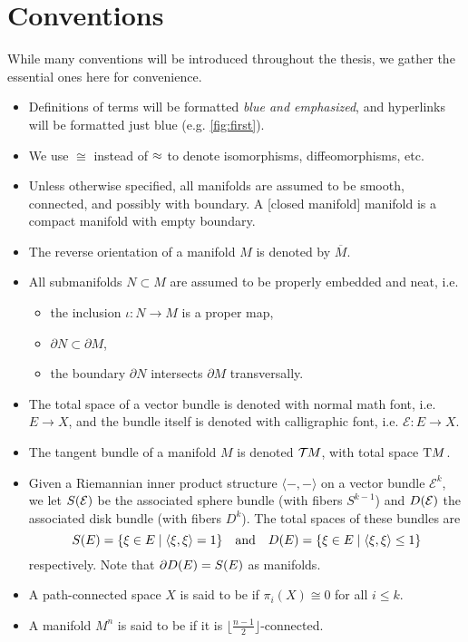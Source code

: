 \section*{Conventions}

While many conventions will be introduced throughout the thesis, we gather the essential ones here for convenience.

\begin{itemize}
  \item Definitions of terms will be formatted {\color{blue}\emph{blue and emphasized}}, and hyperlinks will be formatted just blue (e.g. \cref{fig:first}).
  \item We use $\cong$ instead of $\oldcong$ to denote isomorphisms, diffeomorphisms, etc.
  \item Unless otherwise specified, all manifolds are assumed to be smooth, connected, and possibly with boundary. A [closed manifold] manifold is a compact manifold with empty boundary. 
  \item The reverse orientation of a manifold $M$ is denoted by $\overline{M}$. 
  \item All submanifolds $N\subset M$ are assumed to be properly embedded and neat, i.e.
    \vspace{-0.5em}
    \begin{itemize}
      \item the inclusion $\iota : N \to M$ is a proper map,
      \item $\partial N\subset \partial M$,
      \item the boundary $\partial N$ intersects $\partial M$ transversally.
    \end{itemize}
  \item The total space of a vector bundle is denoted with normal math font, i.e. $E \to X$, and the bundle itself is denoted with calligraphic font, i.e. $\mathcal{E} : E \to X$. 
  \item The tangent bundle of a manifold $M$ is denoted $\TT M$, with total space $\T M$.
  \item Given a Riemannian inner product structure $\langle-,-\rangle$ on a vector bundle $\mathcal{E}^k$, we let $\S(\mathcal{E})$ be the associated sphere bundle (with fibers $S^{k-1}$) and $\D(\mathcal{E})$ the associated disk bundle (with fibers $D^k$). The total spaces of these bundles are
  \[
    \S(E) = \{ \xi\in E \mid \langle \xi, \xi\rangle =1 \}
    \quad\textrm{and}\quad
    \D(E) = \{ \xi\in E \mid \langle \xi, \xi\rangle\leq 1 \}
  \]
  respectively. Note that $\partial \D(E) = \S(E)$ as manifolds.
  \item A path-connected space $X$ is said to be  if $\pi_i(X)\cong 0$ for all $i\leq k$.
  \item A manifold $M^n$ is said to be  if it is $\lfloor \frac{n-1}{2} \rfloor$-connected.
\end{itemize}
\smallrule
